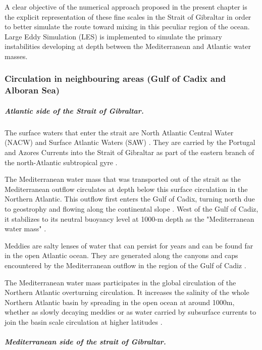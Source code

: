 A clear objective of the numerical approach proposed in the present chapter is the explicit representation of these fine scales in the Strait of Gibraltar in order to better simulate the route toward mixing in this peculiar region of the ocean. Large Eddy Simulation (LES) is implemented to simulate the primary instabilities developing at depth between the Mediterranean and Atlantic water masses.

\subsubsection{Circulation in neighbouring areas (Gulf of Cadix and Alboran Sea)}

\subparagraph{Atlantic side of the Strait of Gibraltar.}

The surface waters that enter the strait are North Atlantic Central Water (NACW) and Surface Atlantic Waters (SAW) \citep{Millot2014,Naranjo2015}. They are carried by the Portugal and Azores Currents into the Strait of Gibraltar as part of the eastern branch of the north-Atlantic subtropical gyre \citep{barton_2001}.

The Mediterranean water mass that was transported out of the strait as the Mediterranean outflow circulates at depth below this surface circulation in the Northern Atlantic. This outflow first enters the Gulf of Cadix, turning north due to geostrophy and flowing along the continental slope \citep{price_1993,gasser_2017}. West of the Gulf of Cadiz, it stabilizes to its neutral buoyancy level at 1000-m depth as the "Mediterranean water mass" \citep{price_1993}.

Meddies are salty lenses of water that can persist for years and can be found far in the open Atlantic ocean. They are generated along the canyons and caps encountered by the Mediterranean outflow in the region of the Gulf of Cadiz \citep{bashmachnikov_2015}. 

The Mediterranean water mass participates in the global circulation of the Northern Atlantic overturning circulation. It increases the salinity of the whole Northern Atlantic basin by spreading in the open ocean at around 1000m, whether as slowly decaying meddies or as water carried by subsurface currents to join the basin scale circulation at higher latitudes \citep{price_1993,jia_2007}.

\subparagraph{Mediterranean side of the strait of Gibraltar.} 

